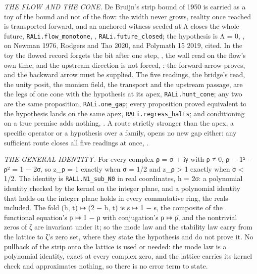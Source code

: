 \documentclass[10pt,twocolumn]{article}
\begin{document}
\emph{THE FLOW AND THE CONE.} De Bruijn's strip bound of 1950 is carried
as a toy of the bound and not of the flow: the width never grows,
reality once reached is transported forward, and an anchored witness
seeded at Λ closes the whole future, \texttt{RALi.flow\_monotone},
\texttt{},
\texttt{RALi.future\_closed}; the hypothesis is Λ = 0,
\texttt{}, on Newman 1976, Rodgers
and Tao 2020, and Polymath 15 2019, cited. In the toy the flowed record
forgets the bit after one step,
\texttt{}, the wall read on the
flow's own time, and the upstream direction is not forced,
\texttt{}: the forward arrow
proves, and the backward arrow must be supplied. The five readings, the
bridge's read, the unity posit, the monism field, the transport and the
upstream passage, are the legs of one cone with the hypothesis at its
apex, \texttt{RALi.hunt\_cone}; any two are the same proposition,
\texttt{RALi.one\_gap}; every proposition proved equivalent to the
hypothesis lands on the same apex, \texttt{RALi.regress\_halts}; and
conditioning on a true premise adds nothing,
\texttt{}. A route strictly stronger than
the apex, a specific operator or a hypothesis over a family, opens no
new gap either: any sufficient route closes all five readings at once,
\texttt{}.

\emph{THE GENERAL IDENTITY.} For every complex ρ = σ + iγ with ρ ≠ 0,
\textbar ρ − 1\textbar² − \textbar ρ\textbar² = 1 − 2σ, so
\textbar z\_ρ\textbar{} = 1 exactly when σ = 1/2 and
\textbar z\_ρ\textbar{} \textgreater{} 1 exactly when σ \textless{} 1/2.
The identity is \texttt{RALi.N1\_sub\_N0} in real coordinates, h = 2σ: a
polynomial identity checked by the kernel on the integer plane, and a
polynomial identity that holds on the integer plane holds in every
commutative ring, the reals included. The fold (h, t) ↦ (2 − h, t) is s
↦ 1 − s̄, the composite of the functional equation's ρ ↦ 1 − ρ with
conjugation's ρ ↦ ρ̄, and the nontrivial zeros of ζ are invariant under
it; so the mode law and the stability law carry from the lattice to ζ's
zero set, where they state the hypothesis and do not prove it. No
pullback of the strip onto the lattice is used or needed: the mode law
is a polynomial identity, exact at every complex zero, and the lattice
carries its kernel check and approximates nothing, so there is no error
term to state.
\end{document}
